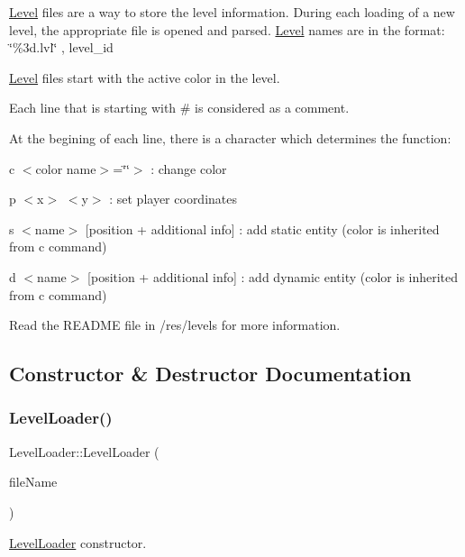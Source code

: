 \hyperlink{class_level}{Level} files are a way to store the level information. During each loading of a new level, the appropriate file is opened and parsed. \hyperlink{class_level}{Level} names are in the format\+: \char`\"{}\%3d.\+lvl\char`\"{} , level\+\_\+id

\hyperlink{class_level}{Level} files start with the active color in the level.

Each line that is starting with \textquotesingle{}\#\textquotesingle{} is considered as a comment.

At the begining of each line, there is a character which determines the function\+:
\begin{DoxyItemize}
\item c $<$color name$>$=\char`\"{}\char`\"{}$>$ \+: change color
\item p $<$x$>$ $<$y$>$ \+: set player coordinates
\item s $<$name$>$ \mbox{[}position + additional info\mbox{]} \+: add static entity (color is inherited from \textquotesingle{}c\textquotesingle{} command)
\item d $<$name$>$ \mbox{[}position + additional info\mbox{]} \+: add dynamic entity (color is inherited from \textquotesingle{}c\textquotesingle{} command)
\end{DoxyItemize}

Read the R\+E\+A\+D\+ME file in /res/levels for more information. 

\subsection{Constructor \& Destructor Documentation}
\mbox{\label{class_level_loader_a9d60ff2b46a0dea2d4fc0859cb4e2f41}} 
\subsubsection{\texorpdfstring{Level\+Loader()}{LevelLoader()}}
{\footnotesize\ttfamily Level\+Loader\+::\+Level\+Loader (\begin{DoxyParamCaption}\item[{const Q\+String \&}]{file\+Name }\end{DoxyParamCaption})}



\hyperlink{class_level_loader}{Level\+Loader} constructor. 


